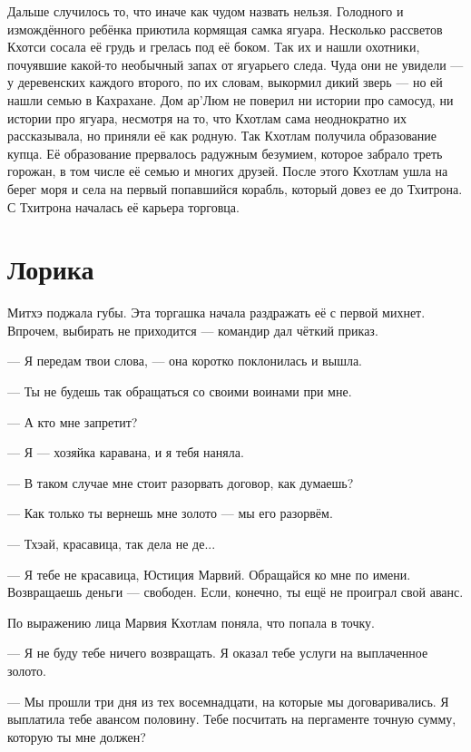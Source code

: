 Дальше случилось то, что иначе как чудом назвать нельзя.
Голодного и измождённого ребёнка приютила кормящая самка ягуара.
Несколько рассветов Кхотси сосала её грудь и грелась под её боком.
Так их и нашли охотники, почуявшие какой-то необычный запах от ягуарьего следа.
Чуда они не увидели --- у деревенских каждого второго, по их словам, выкормил дикий зверь --- но ей нашли семью в Кахрахане.
Дом ар'Люм не поверил ни истории про самосуд, ни истории про ягуара, несмотря на то, что Кхотлам сама неоднократно их рассказывала, но приняли её как родную.
Так Кхотлам получила образование купца.
Её образование прервалось радужным безумием, которое забрало треть горожан, в том числе её семью и многих друзей.
После этого Кхотлам ушла на берег моря и села на первый попавшийся корабль, который довез ее до Тхитрона.
С Тхитрона началась её карьера торговца.

\chapter{Лорика}

Митхэ поджала губы.
Эта торгашка начала раздражать её с первой михнет.
Впрочем, выбирать не приходится --- командир дал чёткий приказ.

--- Я передам твои слова, --- она коротко поклонилась и вышла.

\asterism

--- Ты не будешь так обращаться со своими воинами при мне.

--- А кто мне запретит?

--- Я --- хозяйка каравана, и я тебя наняла.

--- В таком случае мне стоит разорвать договор, как думаешь?

--- Как только ты вернешь мне золото --- мы его разорвём.

--- Тхэай, красавица, так дела не де...

--- Я тебе не красавица, Юстиция Марвий.
Обращайся ко мне по имени.
Возвращаешь деньги --- свободен.
Если, конечно, ты ещё не проиграл свой аванс.

По выражению лица Марвия Кхотлам поняла, что попала в точку.

--- Я не буду тебе ничего возвращать.
Я оказал тебе услуги на выплаченное золото.

--- Мы прошли три дня из тех восемнадцати, на которые мы договаривались.
Я выплатила тебе авансом половину.
Тебе посчитать на пергаменте точную сумму, которую ты мне должен?

